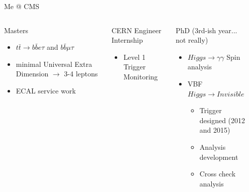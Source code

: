 \documentclass[8pt]{beamer}
\begin{document}
\begin{frame}{Me @ CMS}
 
  \begin{columns}
    \column[t]{6.5cm}
    \begin{block}{Masters}

      \begin{itemize}
        \item $t\bar{t} \rightarrow b\bar{b}e\tau$ and $b\bar{b}\mu\tau$ 
        \item minimal Universal Extra Dimension $\rightarrow$ 3-4 leptons
        \item ECAL service work
      \end{itemize}

    \end{block}

    \begin{block}{CERN Engineer Internship}

     \begin{itemize}
        \item Level 1 Trigger Monitoring
      \end{itemize}

    \end{block}

  \begin{block}{PhD (3rd-ish year... not really)}

    \begin{itemize}
      \item $Higgs \rightarrow \gamma\gamma$ Spin analysis
      \item VBF $Higgs \rightarrow Invisible$
      \begin{itemize}
        \item Trigger designed (2012 and 2015)
        \item Analysis development
        \item Cross check analysis
      \end{itemize}
    \end{itemize}

  \end{block}

    \column[t]{4.5cm}
    \begin{block}


\end{block}
\end{columns}
\end{frame}
\end{document}
